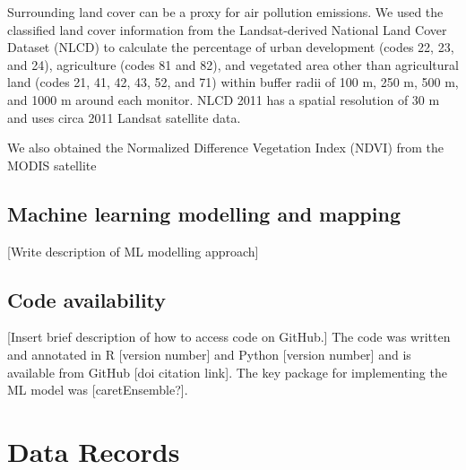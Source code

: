 \documentclass[english]{article}
\begin{document}
Surrounding land cover can be a proxy for air pollution emissions. We used the classified land cover information from the Landsat-derived National Land Cover Dataset (NLCD) \citep{Homer2017} to calculate the percentage of urban development (codes 22, 23, and 24), agriculture (codes 81 and 82), and vegetated area other than agricultural land (codes 21, 41, 42, 43, 52, and 71) within buffer radii of 100 m, 250 m, 500 m, and 1000 m around each monitor. NLCD 2011 has a spatial resolution of 30 m and uses circa 2011 Landsat satellite data. 

We also obtained the Normalized Difference Vegetation Index (NDVI) from the MODIS satellite 


\subsection*{Machine learning modelling and mapping}

[Write description of ML modelling approach]

\subsection*{Code availability}


[Insert brief description of how to access code on GitHub.] The code was written and annotated in R [version number] and Python [version number] and is available from GitHub [doi citation link]. The key package for implementing the ML model was [caretEnsemble?]. 

\section*{Data Records}

\end{document}
